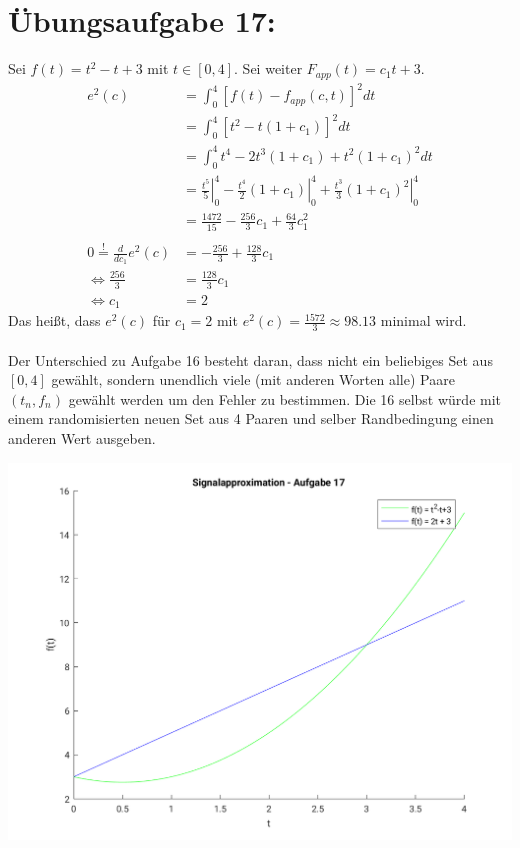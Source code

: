 

	\section*{Übungsaufgabe 17:}
		Sei $f(t) = t^2-t +3$ mit $t\in[0,4]$. Sei weiter $F_{app}(t) = c_1t+3$.
		\begin{align*}
			e^2(c)	&= \int_0^4 \left[ f(t)-f_{app}(c,t) \right]^2 dt\\
					&= \int_0^4 \left[ t^2 -t(1+c_1) \right]^2 dt\\
					&= \int_0^4 t^4 -2t^3(1+c_1) + t^2(1+c_1)^2 dt\\
					&= \left.\frac{t^5}{5}\right|_0^4 - \left.\frac{t^4}{2}(1+c_1)\right|_0^4 + \left.\frac{t^3}{3}(1+c_1)^2 \right|_0^4\\
					&= \frac{1472}{15} - \frac{256}{3}c_1 + \frac{64}{3}c_1^2\\
					&\\
			0\overset{!}{=} \frac{d}{dc_1} e^2(c)	&= -\frac{256}{3} + \frac{128}{3}c_1\\
					\Leftrightarrow	\frac{256}{3}	&= \frac{128}{3}c_1\\
					\Leftrightarrow				c_1	&= 2
		\end{align*}
		Das heißt, dass $e^2(c)$ für $c_1 = 2$ mit $e^2(c) = \frac{1572}{3}\approx 98.13$ minimal wird.\\
		\\
		Der Unterschied zu Aufgabe 16 besteht daran, dass nicht ein beliebiges Set aus $[0,4]$ gewählt, sondern unendlich viele (mit anderen Worten alle) Paare $(t_n, f_n)$ gewählt werden um den Fehler zu bestimmen. Die 16 selbst würde mit einem randomisierten neuen Set aus 4 Paaren und selber Randbedingung einen anderen Wert ausgeben.
		
		\includegraphics[scale = 0.7]{A17_functionPlot.png}
